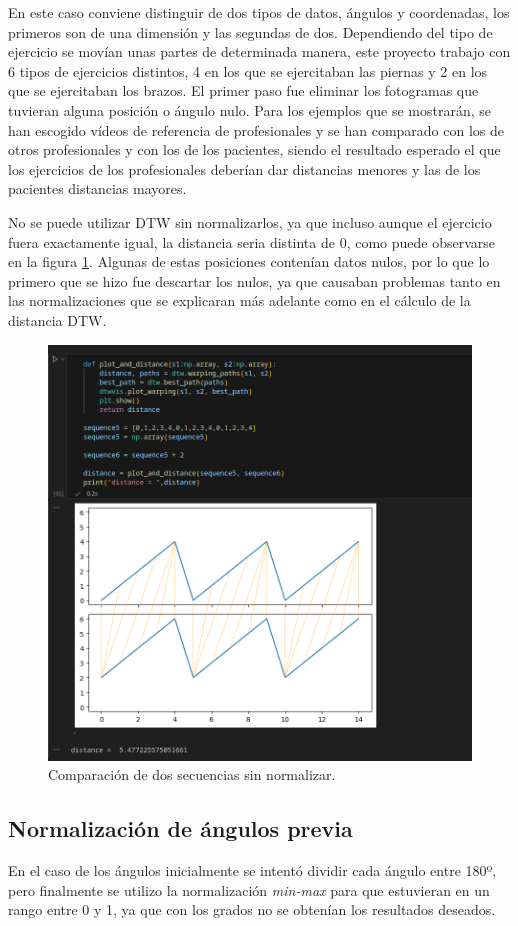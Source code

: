 En este caso conviene distinguir de dos tipos de datos, ángulos y coordenadas, los primeros son de una dimensión y las segundas de dos. Dependiendo del tipo de ejercicio se movían unas partes de determinada manera, este proyecto trabajo con 6 tipos de ejercicios distintos, 4 en los que se ejercitaban las piernas y 2 en los que se ejercitaban los brazos. El primer paso fue eliminar los fotogramas que tuvieran alguna posición o ángulo nulo. Para los ejemplos que se mostrarán, se han escogido vídeos de referencia de profesionales y se han comparado con los de otros profesionales y con los de los pacientes, siendo el resultado esperado el que los ejercicios de los profesionales deberían dar distancias menores y las de los pacientes distancias mayores.

No se puede utilizar DTW sin normalizarlos, ya que incluso aunque el ejercicio fuera exactamente igual, la distancia seria distinta de 0, como puede observarse en la figura \ref{fig:comparacionsinnormalizar}.  Algunas de estas posiciones contenían datos nulos, por lo que lo primero que se hizo fue descartar los nulos, ya que causaban problemas tanto en las normalizaciones que se explicaran más adelante como en el cálculo de la distancia DTW.

\begin{figure}
	\centering
	\includegraphics[width=0.7\linewidth]{img/comparacion_sin_normalizar}
	\caption{Comparación de dos secuencias sin normalizar.}
	\label{fig:comparacionsinnormalizar}
\end{figure}

\subsection{Normalización de ángulos previa}
En el caso de los ángulos inicialmente se intentó dividir cada ángulo entre 180º,  pero finalmente se utilizo la normalización \textit{min-max} para que estuvieran en un rango entre 0 y 1, ya que con los grados no se obtenían los resultados deseados.

